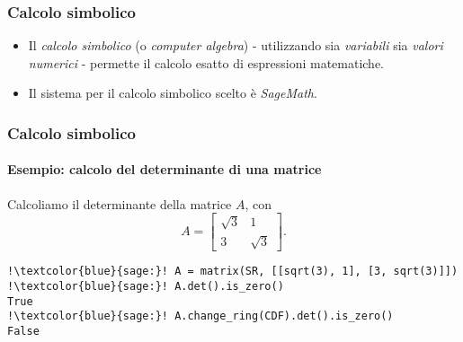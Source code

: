 \begin{frame}
	\frametitle{Calcolo simbolico}
	\begin{itemize}
		\item Il \emph{calcolo simbolico} (o \emph{computer algebra}) - utilizzando sia
		\emph{variabili} sia \emph{valori numerici} - permette il calcolo esatto di
		espressioni matematiche.

		\item {} Il sistema per il calcolo simbolico scelto \`e \emph{SageMath}.
	\end{itemize}
\end{frame}

\begin{frame}[fragile]
	\frametitle{Calcolo simbolico}
	\framesubtitle{Esempio: calcolo del determinante di una matrice}
	Calcoliamo il determinante della matrice $A$, con
	\[
		A = \begin{bmatrix}
			\sqrt{3} & 1 \\
			3 & \sqrt{3}
		\end{bmatrix}.
	\]
	\begin{verbatim}
!\textcolor{blue}{sage:}! A = matrix(SR, [[sqrt(3), 1], [3, sqrt(3)]])
!\textcolor{blue}{sage:}! A.det().is_zero()
True
!\textcolor{blue}{sage:}! A.change_ring(CDF).det().is_zero()
False
	\end{verbatim}
\end{frame}